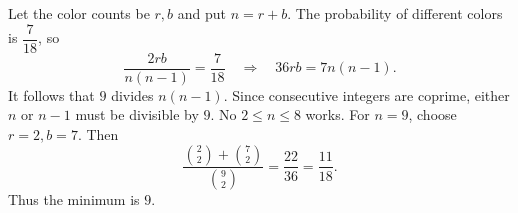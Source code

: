 Let the color counts be $r,b$ and put $n=r+b$. The probability of different colors is $\dfrac{7}{18}$, so
\[
\dfrac{2rb}{n(n-1)}=\dfrac{7}{18}
\quad\Longrightarrow\quad 36rb=7n(n-1).
\]
It follows that $9$ divides $n(n-1)$. Since consecutive integers are coprime, either $n$ or $n-1$ must be divisible by $9$. No $2\le n\le8$ works. For $n=9$, choose $r=2,b=7$. Then
\[
\dfrac{\binom22+\binom72}{\binom92}=\dfrac{22}{36}=\dfrac{11}{18}.
\]
Thus the minimum is $\boxed9$.
